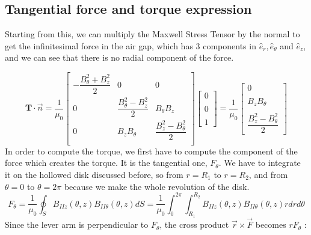 \subsection*{Tangential force and torque expression}

Starting from this, we can multiply the Maxwell Stress Tensor by the normal to get the infinitesimal force in the air gap, which has 3 components in $\hat{e}_r,\hat{e}_{\theta}$ and $\hat{e}_z$, and we can see that there is no radial component of the force.  

\begin{equation*}
    \mathbf{T} \cdot \vec{n} = \dfrac{1}{\mu_0}\begin{bmatrix}
 - \dfrac{B_{\theta}^2 + B_z^2}{2} &0 & 0  \\
0 & \dfrac{B_{\theta}^2 - B_z^2}{2} & B_{\theta}B_z \\
0 & B_zB_{\theta} & \dfrac{B_z^2 - B_{\theta}^2}{2}\\
\end{bmatrix}
 \begin{bmatrix}
 0  \\ \\ 0 \\ \\ 1 
\end{bmatrix}    = \dfrac{1}{\mu_0}
\begin{bmatrix}
 0 \\ \\ B_z B_{\theta} \\ \\ \dfrac{B_z^2-B^2_{\theta}}{2}
\end{bmatrix}
\end{equation*}
\vspace{0.5cm}
In order to compute the torque, we first have to compute the component of the force which creates the torque. It is the tangential one, $F_{\theta}$. We have to integrate it on the hollowed disk discussed before, so from $r=R_1$ to $r=R_2$, and from $\theta = 0$ to $\theta = 2\pi$ because we make the whole revolution of the disk. 
\vspace{0.5cm}
\begin{equation*}
F_{\theta} = \dfrac{1}{\mu_0}\oint_S B_{IIz}(\theta,z)B_{II\theta}(\theta,z) dS = \dfrac{1}{\mu_0}\int_0^{2\pi}\int_{R_1}^{R_2}B_{IIz}(\theta,z)B_{II\theta}(\theta,z)rdrd\theta
\end{equation*}
\vspace{0.5cm}
Since the lever arm is perpendicular to $F_{\theta}$, the cross product $\vec{r} \times \vec{F}$ becomes $rF_{\theta}$ : 

